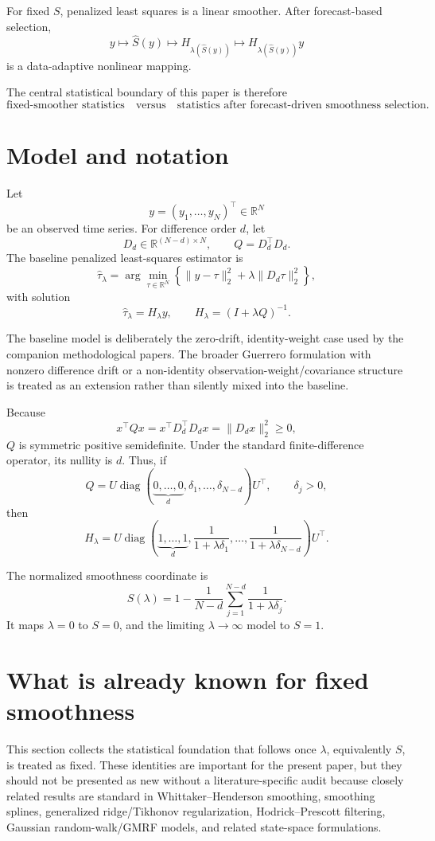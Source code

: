 \documentclass[11pt]{article}
\newcommand{\diag}{\operatorname{diag}}
\newcommand{\R}{\mathbb R}
\begin{document}
For fixed \(S\), penalized least squares is a linear smoother. After
forecast-based selection,
\[
y
\longmapsto
\widehat S(y)
\longmapsto
H_{\lambda(\widehat S(y))}
\longmapsto
H_{\lambda(\widehat S(y))}y
\]
is a data-adaptive nonlinear mapping.

The central statistical boundary of this paper is therefore
\[
\boxed{
\text{fixed-smoother statistics}
\quad\text{versus}\quad
\text{statistics after forecast-driven smoothness selection}.
}
\]

\section{Model and notation}

Let
\[
y=(y_1,\ldots,y_N)^\top\in\R^N
\]
be an observed time series. For difference order \(d\), let
\[
D_d\in\R^{(N-d)\times N},
\qquad
Q=D_d^\top D_d.
\]
The baseline penalized least-squares estimator is
\[
\widehat\tau_\lambda
=
\arg\min_{\tau\in\R^N}
\left\{
\|y-\tau\|_2^2
+
\lambda\|D_d\tau\|_2^2
\right\},
\]
with solution
\[
\boxed{
\widehat\tau_\lambda
=
H_\lambda y,
\qquad
H_\lambda=(I+\lambda Q)^{-1}.
}
\]

The baseline model is deliberately the zero-drift, identity-weight case used by
the companion methodological papers. The broader Guerrero formulation with
nonzero difference drift or a non-identity observation-weight/covariance
structure is treated as an extension rather than silently mixed into the
baseline.

Because
\[
x^\top Qx
=
x^\top D_d^\top D_dx
=
\|D_dx\|_2^2
\ge0,
\]
\(Q\) is symmetric positive semidefinite. Under the standard finite-difference
operator, its nullity is \(d\). Thus, if
\[
Q
=
U\diag(
\underbrace{0,\ldots,0}_{d},
\delta_1,\ldots,\delta_{N-d}
)U^\top,
\qquad
\delta_j>0,
\]
then
\[
H_\lambda
=
U\diag\left(
\underbrace{1,\ldots,1}_{d},
\frac1{1+\lambda\delta_1},
\ldots,
\frac1{1+\lambda\delta_{N-d}}
\right)U^\top.
\]

The normalized smoothness coordinate is
\[
\boxed{
S(\lambda)
=
1-
\frac1{N-d}
\sum_{j=1}^{N-d}
\frac1{1+\lambda\delta_j}.
}
\]
It maps \(\lambda=0\) to \(S=0\), and the limiting
\(\lambda\to\infty\) model to \(S=1\).

\section{What is already known for fixed smoothness}

This section collects the statistical foundation that follows once
\(\lambda\), equivalently \(S\), is treated as fixed. These identities are
important for the present paper, but they should not be presented as new
without a literature-specific audit because closely related results are
standard in Whittaker--Henderson smoothing, smoothing splines, generalized
ridge/Tikhonov regularization, Hodrick--Prescott filtering, Gaussian
random-walk/GMRF models, and related state-space formulations.
\end{document}
